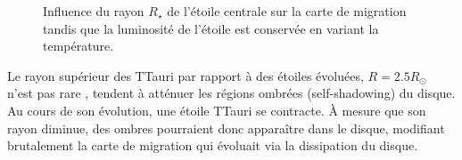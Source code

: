 \begin{figure}[htb]
\centering
{}
\hfill
{}

\hfill
{}
\caption{Influence du rayon $R_\star$ de l'étoile centrale sur la carte de migration tandis que la luminosité de l'étoile est conservée en variant la température. }
\end{figure}\label{fig:map_TTauri_radius}

Le rayon supérieur des TTauri par rapport à des étoiles évoluées, $R=2.5R_\odot$ n'est pas rare , tendent à atténuer les régions ombrées (\og self-shadowing\fg) du disque. Au cours de son évolution, une étoile TTauri se contracte. À mesure que son rayon diminue, des ombres pourraient donc apparaître dans le disque, modifiant brutalement la carte de migration qui évoluait via la dissipation du disque.

